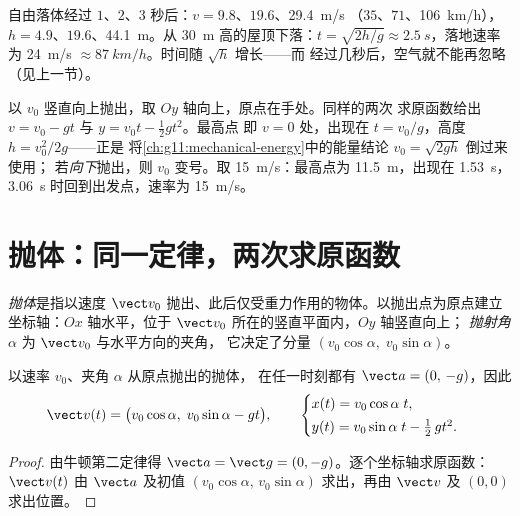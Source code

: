 \begin{example}[数量级]\label{ex:g12:projectile-motion:orders}
自由落体经过 $1$、$2$、$3$ 秒后：$v = 9.8$、$19.6$、\qty{29.4}{m/s}
（$35$、$71$、\qty{106}{km/h}），$h = 4.9$、$19.6$、\qty{44.1}{m}。从
\qty{30}{m} 高的屋顶下落：$t = \sqrt{2h/g} \approx \qty{2.5}{s}$，落地速率为
\qty{24}{m/s} $\approx \qty{87}{km/h}$。时间随 $\sqrt h$ 增长——而
经过几秒后，空气就不能再忽略（见上一节）。
\end{example}

\begin{example}[竖直上抛]\label{ex:g12:projectile-motion:throw}
以 $v_0$ 竖直向上抛出，取 $Oy$ 轴向上，原点在手处。同样的两次
求原函数给出 $v = v_0 - gt$ 与 $y = v_0 t - \tfrac12 gt^2$。最高点
即 $v = 0$ 处，出现在 $t = v_0/g$，高度 $h = v_0^2/2g$——正是
将\cref{ch:g11:mechanical-energy}中的能量结论 $v_0 = \sqrt{2gh}$ 倒过来使用；
若\emph{向下}抛出，则 $v_0$ 变号。取 \qty{15}{m/s}：最高点为
\qty{11.5}{m}，出现在 \qty{1.53}{s}，\qty{3.06}{s} 时回到出发点，速率为 \qty{15}{m/s}。
\end{example}

\section{抛体：同一定律，两次求原函数}

\begin{definition}[抛体]\label{def:g12:projectile-motion:projectile}
\emph{抛体}是指以速度
$\vect v_0$ 抛出、此后仅受重力作用的物体。以抛出点为原点建立坐标轴：$Ox$
轴水平，位于 $\vect v_0$ 所在的竖直平面内，$Oy$ 轴竖直向上；
\emph{抛射角} $\alpha$ 为 $\vect v_0$ 与水平方向的夹角，
它决定了分量 $(v_0\cos\alpha,\; v_0\sin\alpha)$。
\end{definition}

\begin{theorem}[运动方程]\label{thm:g12:projectile-motion:equations}
以速率 $v_0$、夹角 $\alpha$ 从原点抛出的抛体，
在任一时刻都有 $\vect a = (0,\,-g)$，因此
\[
\vect v(t) = \bigl(v_0\cos\alpha,\; v_0\sin\alpha - g t\bigr),
\qquad
\begin{cases}
x(t) = v_0\cos\alpha\; t,\\[2pt]
y(t) = v_0\sin\alpha\; t - \tfrac12\, g t^2 .
\end{cases}
\]
\end{theorem}

\begin{proof}
由牛顿第二定律得 $\vect a = \vect g = (0,-g)$。逐个坐标轴求原函数：
$\vect v(t)$ 由 $\vect a$ 及初值
$(v_0\cos\alpha,\, v_0\sin\alpha)$ 求出，再由 $\vect v$ 及 $(0,0)$ 求出位置。
\end{proof}

